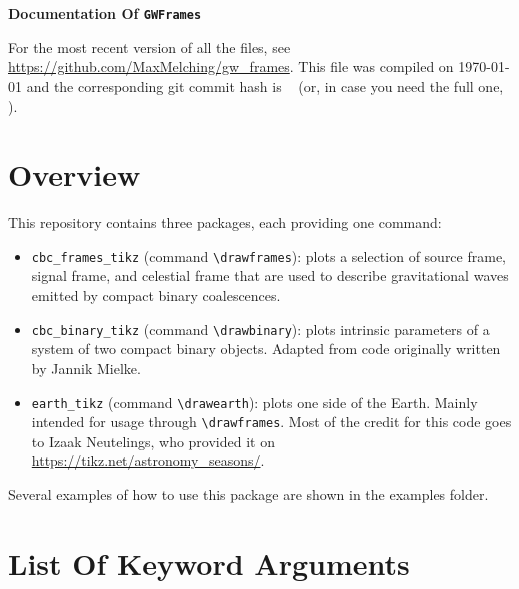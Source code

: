\documentclass[
    DIV=11,
    BCOR=0mm,
    paper=a4,
    fontsize=11pt,
    twoside=false,
    titlepage=true
]{scrartcl}
\newcommand{\code}[1]{\textcolor{codecolor}{\texttt{#1}}}
\newcommand{\gitrevision}{%
  \StrLeft{\HEAD}{7}%
}
\begin{document}
{\rmfamily\Huge\bfseries
    Documentation Of \code{GWFrames}
}

For the most recent version of all the files, see \url{https://github.com/MaxMelching/gw_frames}.
This file was compiled on \today{} and the corresponding git commit hash
is \code{\gitrevision{}} (or, in case you need the full one, \code{\HEAD{}}\hspace{-0.5em}).



    \section{Overview}

This repository contains three packages, each providing one command:
\begin{itemize}
    \item \code{cbc\_frames\_tikz} (command \verb|\drawframes|): plots a
    selection of source frame, signal frame, and celestial frame that are
    used to describe gravitational waves emitted by compact binary coalescences.
    
    
    \item \code{cbc\_binary\_tikz} (command \verb|\drawbinary|): plots
    intrinsic parameters of a system of two compact binary objects. Adapted
    from code originally written by Jannik Mielke.
    
    
    \item \code{earth\_tikz} (command \verb|\drawearth|): plots one side of
    the Earth. Mainly intended for usage through \verb|\drawframes|. Most of
    the credit for this code goes to Izaak Neutelings, who provided it on
    \url{https://tikz.net/astronomy_seasons/}.
\end{itemize}

Several examples of how to use this package are shown in the examples folder.





    \section{List Of Keyword Arguments}
\end{document}

